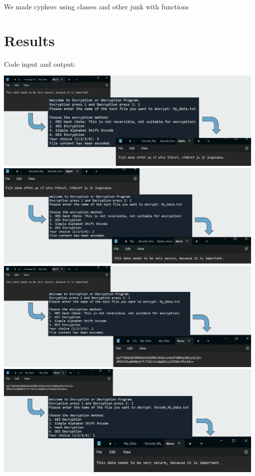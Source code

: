 \documentclass[12pt]{article}
\begin{document}
We made cyphers using classes
and other junk with functions

\section{Results}
Code input and output:
\begin{center}
\includegraphics[width=1\linewidth]{image.png}
\includegraphics[width=1\linewidth]{1.png}
\includegraphics[width=1\linewidth]{2.png}
\includegraphics[width=1\linewidth]{3.png}
\end{center}
\end{document}
